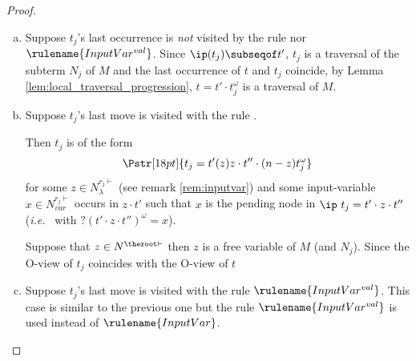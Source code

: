 \begin{proof}
\begin{enumerate}[$\bullet$]
\begin{enumerate}
\begin{enumerate}[-]
    \begin{enumerate}[(a)]
    \item  Suppose $t_j$'s last occurrence is \emph{not} visited by the rule  nor $\rulename{InputVar^{val}}$. Since $\ip( t_j) \subseqof t'$, $t_j$ is a traversal of the subterm $N_j$ of $M$ and the last occurrence
        of $t$ and $t_j$ coincide, by Lemma
        \ref{lem:local_traversal_progression}, $t =
        t' \cdot t_j^\omega$ is a traversal of $M$.

    \item Suppose $t_j$'s last move is visited with the rule .

    Then $t_j$ is of the form
    $$\Pstr[18pt]{ t_j = t' (z)z \cdot t'' \cdot (n-z){t_j^\omega}}$$
for some $z \in N_\lambda^{r_j\vdash}$ (see remark
\ref{rem:inputvar}) and some input-variable $x \in
N^{r_j\vdash}_{var}$ occurs in $z\cdot t'$ such that
$x$ is
 the pending node in $\ip\ t_j = t' \cdot z \cdot
 t''$ ({\it i.e.}~ with $?(t' \cdot z \cdot
 t'')^\omega = x$).

Suppose that $z\in N^{\theroot\vdash}$ then $z$ is a free variable of $M$ (and $N_j$).
Since the O-view of $t_j$ coincides with the O-view of $t$

    \item Suppose $t_j$'s last move is visited with the rule $\rulename{InputVar^{val}}$.
    This case is similar to the previous one but the rule $\rulename{InputVar^{val}}$ is used instead
    of $\rulename{InputVar}$.
    \end{enumerate}



\end{enumerate}
\end{enumerate}
\end{enumerate}
\end{proof}
